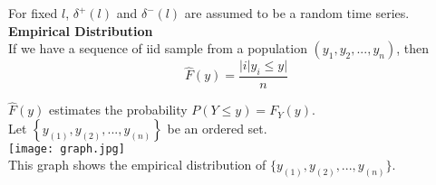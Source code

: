 \documentclass[a4paper]{article}
\numberwithin{equation}{subsection}
\begin{document}
For fixed $l$, $\delta^+ (l)$ and $\delta^- (l)$ are assumed to be a random time series.\\

\noindent
\textbf{Empirical Distribution}\\

If we have a sequence of iid sample from a population $(y_1, y_2, ..., y_n)$, then $$ \hat{F}(y)= \frac{|i|y_i\le y|}{n}$$

$\hat{F}(y)$ estimates the probability $P(Y\le y)=F_Y(y)$.\\

\noindent
Let $\left\{ y_{(1)},y_{(2)},...,y_{(n)}\right\}$ be an ordered set.\\

\texttt{[image: graph.jpg]}\\

\noindent This graph shows the empirical distribution of $\{ y_{(1)},y_{(2)},...,y_{(n)}\}$.
\end{document}
